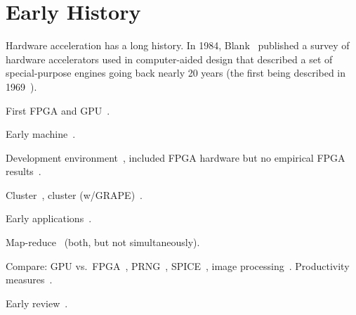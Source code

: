 \section{Early History}
\label{sec:history}

Hardware acceleration has a long history.  In 1984, Blank~\cite{Blank84}
published a survey of hardware accelerators used in computer-aided design 
that described a set of special-purpose engines going back nearly 20 years
(the first being described in 1969~\cite{McKay69}).

First FPGA and GPU~\cite{khdo06}.

Early machine~\cite{kdh+06}.

Development environment~\cite{cft+10},
included FPGA hardware but no empirical FPGA results~\cite{dy08}.

Cluster~\cite{tl10}, cluster (w/GRAPE)~\cite{sbm+09}.

Early applications~\cite{bkdb10,khdo06,shsc08,tl10}.

Map-reduce~\cite{ytt+08} (both, but not simultaneously).

Compare: GPU vs.~FPGA~\cite{bnw+10,cls+08,cmhm10,cz09,jpbc10,sww+10,tb10},
PRNG~\cite{thl09,tb09}, SPICE~\cite{kd09}, image processing~\cite{amy09}.
Productivity measures~\cite{jpbc10}.

Early review~\cite{bdh+10}.

